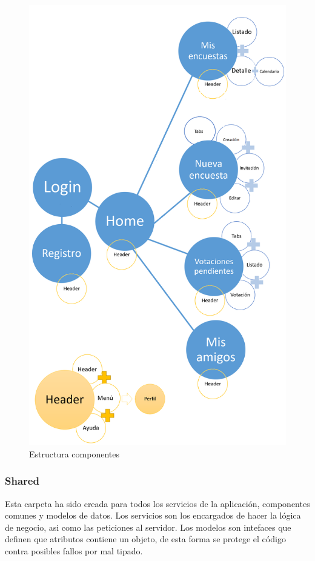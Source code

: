 \documentclass[a4paper, 12pt]{book}
\begin{document}
\begin{figure}[H]
  \centering
  \includegraphics[width=13cm, keepaspectratio]{img/arq_comp.png}
  \caption{Estructura componentes}
  \label{figura:arq_comp}
\end{figure}


\subsubsection{Shared} 
\label{sec:shared}

Esta carpeta ha sido creada para todos los servicios de la aplicaci\'on, componentes comunes y modelos de datos. Los servicios son 
los encargados de hacer la l\'ogica de negocio, asi como las peticiones al servidor. Los modelos son intefaces que definen que atributos
contiene un objeto, de esta forma se protege el c\'odigo contra posibles fallos por mal tipado.
\end{document}

